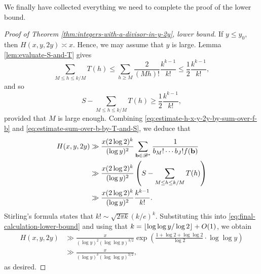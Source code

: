 We finally have collected everything we need to complete the proof of the lower bound.
\begin{proof}[Proof of Theorem \ref{thm:integers-with-a-divisor-in-y-2y}, lower bound]
    If $y \le y_0$, then $H(x, y, 2y) \asymp x$.
    Hence, we may assume that $y$ is large.
    Lemma \ref{lem:evaluate-S-and-T} gives
    \begin{equation*}
        \sum \limits_{M \le h \le k/M} T(h) \le \sum \limits_{h \ge M}\frac{2}{(Mh)!} \frac{k^{k - 1}}{k!} \le \frac{1}{2} \frac{k^{k - 1}}{k!},
    \end{equation*}
    and so 
    \begin{equation*}
        S - \sum \limits_{M \le h \le k/M} T(h) \ge \frac{1}{2} \frac{k^{k - 1}}{k!},
    \end{equation*}
    provided that $M$ is large enough.
    Combining \eqref{eq:estimate-h-x-y-2y-by-sum-over-f-b} and \eqref{eq:estimate-sum-over-b-by-T-and-S}, we deduce that
    \begin{align} \label{eq:final-calculation-lower-bound}
        H(x, y, 2y) &\gg \frac{x(2 \log 2)^k}{(\log y)^2} \sum \limits_{\mathbf{b} \in \mathscr{B}^*} \frac{1}{b_M! \cdots b_J! f(\mathbf{b})} \nonumber \\
            &\gg \frac{x(2 \log 2)^k}{(\log y)^2} \left( S - \sum \limits_{M \le h \le k/M} T(h) \right) \nonumber \\ 
            &\gg \frac{x(2 \log 2)^k}{(\log y)^2} \frac{k^{k - 1}}{k!}.
    \end{align}
    Stirling's formula states that $
        k! \sim \sqrt{2 \pi k} (k/e)^k$.
    Substituting this into \eqref{eq:final-calculation-lower-bound} and using that $k = \left\lfloor \log \log y / \log 2 \right\rfloor + O(1)$, we obtain
    \begin{align*}
        H(x, y, 2y) &\gg \frac{x}{(\log y)^2 (\log \log y)^{3/2}} \exp \left( \frac{1 + \log 2 + \log \log 2}{\log 2} \cdot \log \log y \right) \\ 
        &\gg \frac{x}{(\log y)^\delta (\log \log y)^{3/2}},
    \end{align*}
    as desired.
\end{proof}

